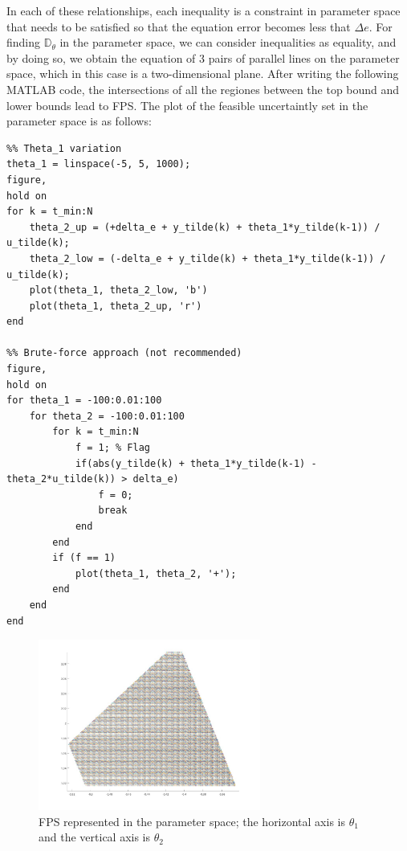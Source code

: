 In each of these relationships, each inequality is a constraint in parameter space that needs to be satisfied so that the equation error becomes less that \(\Delta e\). For finding \(\mathbb{D}_\theta\) in the parameter space, we can consider inequalities as equality, and by doing so, we obtain the equation of 3 pairs of parallel lines on the parameter space, which in this case is a two-dimensional plane. After writing the following MATLAB code, the intersections of all the regiones between the top bound and lower bounds lead to FPS. The plot of the feasible uncertaintly set in the parameter space is as follows:
\begin{example}
\begin{lstlisting}
%% Theta_1 variation
theta_1 = linspace(-5, 5, 1000);
figure,
hold on
for k = t_min:N
    theta_2_up = (+delta_e + y_tilde(k) + theta_1*y_tilde(k-1)) / u_tilde(k);
    theta_2_low = (-delta_e + y_tilde(k) + theta_1*y_tilde(k-1)) / u_tilde(k);
    plot(theta_1, theta_2_low, 'b')
    plot(theta_1, theta_2_up, 'r')
end

%% Brute-force approach (not recommended)
figure,
hold on
for theta_1 = -100:0.01:100
    for theta_2 = -100:0.01:100
        for k = t_min:N
            f = 1; % Flag
            if(abs(y_tilde(k) + theta_1*y_tilde(k-1) - theta_2*u_tilde(k)) > delta_e)
                f = 0;
                break
            end
        end
        if (f == 1)
            plot(theta_1, theta_2, '+');
        end
    end
end
\end{lstlisting}
\end{example}


\begin{figure}[htbp]  %
    \centering
    \includegraphics[width=0.65\textwidth]{images/FPS.jpg}
    \caption{FPS represented in the parameter space; the horizontal axis is \(\theta_1\) and the vertical axis is \(\theta_2 \)}
    \label{fig:PFS}
\end{figure}

